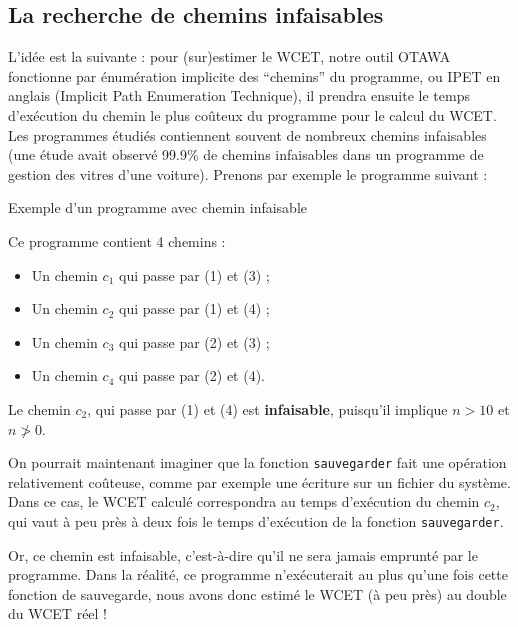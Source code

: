 \documentclass[french]{article}
\begin{document}
  \subsection{La recherche de chemins infaisables}
  L'idée est la suivante : pour (sur)estimer le WCET, notre outil OTAWA fonctionne par énumération implicite des ``chemins'' du programme, ou IPET en anglais (Implicit Path Enumeration Technique), il prendra ensuite le temps d'exécution du chemin le plus coûteux du programme pour le calcul du WCET. Les programmes étudiés contiennent souvent de nombreux chemins infaisables (une étude avait observé 99.9\% de chemins infaisables dans un programme de gestion des vitres d'une voiture). Prenons par exemple le programme suivant :

  \begin{algorithm}
    \label{alg:1}
    \caption{Exemple d'un programme avec chemin infaisable}
  \end{algorithm}

  Ce programme contient 4 chemins :
  \begin{itemize}
    \item Un chemin $c_1$ qui passe par (1) et (3) ;
    \item Un chemin $c_2$ qui passe par (1) et (4) ;
    \item Un chemin $c_3$ qui passe par (2) et (3) ;
    \item Un chemin $c_4$ qui passe par (2) et (4).
  \end{itemize}

  Le chemin $c_2$, qui passe par (1) et (4) est \textbf{infaisable}, puisqu'il implique $n > 10$ et $n \ngtr 0$.

  On pourrait maintenant imaginer que la fonction \texttt{sauvegarder} fait une opération relativement coûteuse, comme par exemple une écriture sur un fichier du système. Dans ce cas, le WCET calculé correspondra au temps d'exécution du chemin $c_2$, qui vaut à peu près à deux fois le temps d'exécution de la fonction \texttt{sauvegarder}.

  Or, ce chemin est infaisable, c'est-à-dire qu'il ne sera jamais emprunté par le programme. Dans la réalité, ce programme n'exécuterait au plus qu'une fois cette fonction de sauvegarde, nous avons donc estimé le WCET (à peu près) au double du WCET réel !
\end{document}
